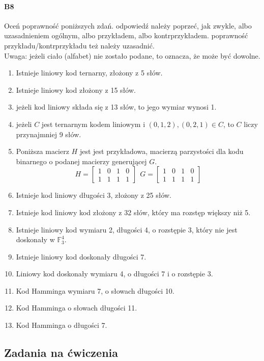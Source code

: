 \documentclass[a4paper,12pt]{article}
\theoremstyle{definition}%
\theoremstyle{definition}
\theoremstyle{problem}
\begin{document}
\paragraph{B8} Oceń poprawność poniższych zdań. odpowiedź należy poprzeć, jak zwykle, albo uzasadnieniem ogólnym, albo przykładem, albo kontrprzykładem. poprawność przykładu/kontrprzykładu też należy uzasadnić. \\Uwaga: jeżeli
ciało (alfabet) nie zostało podane, to oznacza, że może być dowolne.
\begin{enumerate}[label=\alph*)]
\item Istnieje liniowy kod ternarny, złożony z 5 słów.
\item Istnieje liniowy kod złożony z 15 słów.
\item jeżeli kod liniowy składa się z 13 słów, to jego wymiar wynosi 1.
\item jeżeli $C$ jest ternarnym kodem liniowym i $(0, 1, 2),(0, 2, 1) \in C$, to $C$ liczy przynajmniej 9 słów.
\item Poniższa macierz $H$ jest jest przykładowa, macierzą parzystości dla kodu binarnego o podanej macierzy generującej $G$.
$$H =
\begin{bmatrix}
1& 0& 1& 0\\
1& 1 &1& 1 
\end{bmatrix}\ \ 
G =
\begin{bmatrix}
1& 0& 1& 0\\
1& 1& 1& 1 
\end{bmatrix}$$
\item Istnieje kod liniowy długości 3, złożony z 25 słów.
\item Istnieje kod liniowy kod złożony z 32 słów, który ma rozstęp większy niż 5.
\item Istnieje liniowy kod wymiaru 2, długości 4, o rozstępie 3, który nie jest doskonały w $\mathbb{F}^4_3$.
\item Istnieje liniowy kod doskonały długości 7.
\item Liniowy kod doskonały wymiaru 4, o długości 7 i o rozstępie 3.
\item Kod Hamminga wymiaru 7, o słowach długości 10.
\item Kod Hamminga o słowach długości 11.
\item Kod Hamminga o długości 7.
\end{enumerate}

\subsection{Zadania na ćwiczenia}
\end{document}
